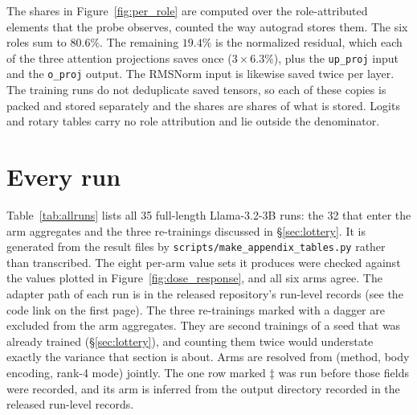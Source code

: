 \documentclass[11pt,letterpaper]{article}
\begin{document}
The shares in Figure~\ref{fig:per_role} are computed over the role-attributed elements that the probe observes, counted the way autograd stores them. The six roles sum to $80.6\%$. The remaining $19.4\%$ is the normalized residual, which each of the three attention projections saves once ($3 \times 6.3\%$), plus the \texttt{up\_proj} input and the \texttt{o\_proj} output. The RMSNorm input is likewise saved twice per layer. The training runs do not deduplicate saved tensors, so each of these copies is packed and stored separately and the shares are shares of what is stored. Logits and rotary tables carry no role attribution and lie outside the denominator.

\section{Every run}
\label{app:runs}

Table~\ref{tab:allruns} lists all 35 full-length Llama-3.2-3B runs: the 32 that enter the arm aggregates and the three re-trainings discussed in \S\ref{sec:lottery}. It is generated from the result files by \texttt{scripts/}\allowbreak\texttt{make\_appendix\_tables.py} rather than transcribed. The eight per-arm value sets it produces were checked against the values plotted in Figure~\ref{fig:dose_response}, and all six arms agree. The adapter path of each run is in the released repository's run-level records (see the code link on the first page). The three re-trainings marked with a dagger are excluded from the arm aggregates. They are second trainings of a seed that was already trained (\S\ref{sec:lottery}), and counting them twice would understate exactly the variance that section is about. Arms are resolved from (method, body encoding, rank-4 mode) jointly. The one row marked $\ddagger$ was run before those fields were recorded, and its arm is inferred from the output directory recorded in the released run-level records.
\end{document}
